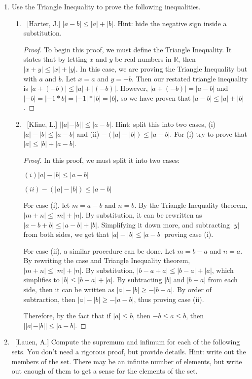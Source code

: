 \documentclass[10pt]{article}
\begin{document}
\begin{enumerate}
\item  Use the Triangle Inequality to prove the following inequalities.

	\begin{enumerate}
	
	\item  ~[Harter, J.] $|a-b| \leq |a| + |b|$.  Hint: hide the negative sign inside a substitution.
 \begin{proof}
 To begin this proof, we must define the Triangle Inequality.  It states that by letting $x$ and $y$ be real numbers in $\mathbb{R}$, then $|x + y| \leq |x| + |y|$.  In this case, we are proving the Triangle Inequality but with $a$ and $b$.  Let $x = a$ and $y = -b$.  Then our restated triangle inequality is $|a + (-b)| \leq |a| + |(-b)|$.  However, $|a+(-b)| = |a-b|$ and $|-b|=|-1*b|=|-1|*|b|=|b|$, so we have proven that $|a-b| \leq |a| + |b|$.
 \end{proof}	
	\item  ~[Kline, L.] $||a| - |b|| \leq |a-b|$.  Hint: split this into two cases, (i) $|a| - |b| \leq |a-b|$ and (ii) $-(|a| - |b|) \leq |a-b|$.  For (i) try to prove that $|a| \leq |b| + |a-b|$.
 \begin{proof}
In this proof, we must split it into two cases: 
\begin{center}
 $(i) |a|-|b| \leq |a-b|$
 
 $(ii) -(|a|-|b|) \leq |a-b|$
\end{center}
For case (i), let $m = a-b$ and $n = b$.  By the Triangle Inequality theorem, $|m+n| \leq |m| + |n|$.  By substitution, it can be rewritten as $|a-b+b| \leq |a-b|+|b|$.  Simplifying it down more, and subtracting $|y|$ from both sides, we get that $|a|-|b| \leq |a-b|$ proving case (i).

For case (ii), a similar procedure can be done.  Let $m = b-a$ and $n = a$.  By rewriting the case and Triangle Inequality theorem, $|m+n| \leq |m| + |n|$.  By substitution, $|b-a+a| \leq |b-a|+|a|$, which simplifies to $|b| \leq |b-a| + |a|$.  By subtracting $|b|$ and $|b-a|$ from each side, then it can be written as $|a| - |b| \geq -|b-a|$.  By order of subtraction, then $|a| - |b| \geq -|a-b|$, thus proving case (ii).

Therefore, by the fact that if $|a| \leq b$, then $-b \leq a \leq b$, then $||a| - |b|| \leq |a-b|$.
 \end{proof}	
	\end{enumerate}
	
\item  ~[Lauen, A.] Compute the supremum and infimum for each of the following sets.  You don't need a rigorous proof, but provide details.  Hint: write out the members of the set.  There may be an infinite number of elements, but write out enough of them to get a sense for the elements of the set.


\end{enumerate}
\end{document}
